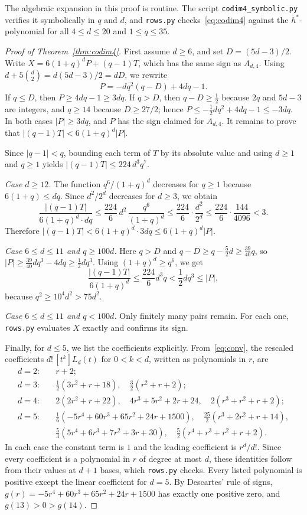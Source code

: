 \documentclass[11pt]{amsart}
\theoremstyle{remark}
\begin{document}
The algebraic expansion in this proof is routine. The script
\texttt{codim4\_symbolic.py} verifies it symbolically in $q$ and $d$, and
\texttt{rows.py} checks~\eqref{eq:codim4} against the $h^*$-polynomial for all
$4\le d\le20$ and $1\le q\le35$.

\begin{proof}[Proof of Theorem~\ref{thm:codim4}]
First assume $d\ge6$, and set $D=(5d-3)/2$. Write $X=6(1+q)^dP+(q-1)T$, which
has the same sign as $A_{d,4}$. Using $d+5\binom d2=d(5d-3)/2=dD$, we rewrite
\[
 P=-dq^2(q-D)+4dq-1.
\]
If $q\le D$, then $P\ge4dq-1\ge3dq$. If $q>D$, then $q-D\ge\frac12$ because
$2q$ and $5d-3$ are integers, and $q\ge14$ because $D\ge27/2$; hence
$P\le-\frac12dq^2+4dq-1\le-3dq$. In both cases $|P|\ge3dq$, and $P$ has the
sign claimed for $A_{d,4}$. It remains to prove that $|(q-1)T|<6(1+q)^d|P|$.

Since $|q-1|<q$, bounding each term of $T$ by its absolute value and using
$d\ge1$ and $q\ge1$ yields $|(q-1)T|\le224\,d^3q^7$.

\emph{Case $d\ge12$.} The function $q^6/(1+q)^d$ decreases for $q\ge1$ because
$6(1+q)\le dq$. Since $d^2/2^d$ decreases for $d\ge3$, we obtain
\[
 \frac{|(q-1)T|}{6(1+q)^d\cdot dq}\le\frac{224}{6}\,d^2\,\frac{q^6}{(1+q)^d}
 \le\frac{224}{6}\cdot\frac{d^2}{2^d}\le\frac{224}{6}\cdot\frac{144}{4096}<3.
\]
Therefore $|(q-1)T|<6(1+q)^d\cdot3dq\le6(1+q)^d|P|$.

\emph{Case $6\le d\le11$ and $q\ge100d$.} Here $q>D$ and
$q-D\ge q-\frac52d\ge\frac{39}{40}q$, so
$|P|\ge\frac{39}{40}dq^3-4dq\ge\frac12dq^3$. Using $(1+q)^d\ge q^6$, we get
\[
 \frac{|(q-1)T|}{6(1+q)^d}\le\frac{224}{6}d^3q<\frac12dq^3\le|P|,
\]
because $q^2\ge10^4d^2>75d^2$.

\emph{Case $6\le d\le11$ and $q<100d$.} Only finitely many pairs remain. For
each one, \texttt{rows.py} evaluates $X$ exactly and confirms its sign.

Finally, for $d\le5$, we list the coefficients explicitly. From~\eqref{eq:conv},
the rescaled coefficients $d!\,[t^k]L_d(t)$ for $0<k<d$, written as
polynomials in $r$, are
\begin{align*}
 d=2:&\quad r+2;\\
 d=3:&\quad \tfrac12(3r^2+r+18),\quad \tfrac32(r^2+r+2);\\
 d=4:&\quad 2(2r^2+r+22),\quad 4r^3+5r^2+2r+24,\quad 2(r^3+r^2+r+2);\\
 d=5:&\quad \tfrac16(-5r^4+60r^3+65r^2+24r+1500),\quad \tfrac{25}2(r^3+2r^2+r+14),\\
 &\quad \tfrac53(5r^4+6r^3+7r^2+3r+30),\quad \tfrac52(r^4+r^3+r^2+r+2).
\end{align*}
In each case the constant term is $1$ and the leading coefficient is $r^d/d!$.
Since every coefficient is a polynomial in $r$ of degree at most $d$, these
identities follow from their values at $d+1$ bases, which \texttt{rows.py}
checks. Every listed polynomial is positive except the linear coefficient for
$d=5$. By Descartes' rule of signs, $g(r)=-5r^4+60r^3+65r^2+24r+1500$ has
exactly one positive zero, and $g(13)>0>g(14)$.
\end{proof}
\end{document}
